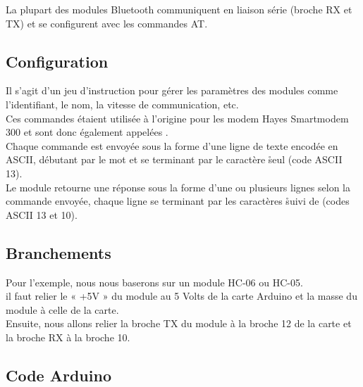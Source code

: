 
La plupart des modules Bluetooth communiquent en liaison série (broche RX et TX) et se configurent avec les commandes AT.

\subsection{Configuration}

Il s'agit d'un jeu d'instruction pour gérer les paramètres des modules comme l'identifiant, le nom, la vitesse de communication, etc.\\

Ces commandes étaient utilisée à l'origine pour les modem Hayes Smartmodem 300 et sont donc également appelées .\\

Chaque commande est envoyée sous la forme d'une ligne de texte encodée en ASCII, débutant par le mot  et se terminant par le caractère \r seul (code ASCII 13).\\ 
Le module retourne une réponse sous la forme d'une ou plusieurs lignes selon la commande envoyée, chaque ligne se terminant par les caractères \r suivi de \n (codes ASCII 13 et 10).


\subsection{Branchements}


Pour l'exemple, nous nous baserons sur un module HC-06 ou HC-05.\\

il faut relier le « +5V » du module au  5 Volts de la carte Arduino et la masse du module à celle de la carte.\\
Ensuite, nous allons relier la broche TX du module à la broche 12 de la carte et la broche RX à la broche 10. \\


\subsection{Code Arduino}



